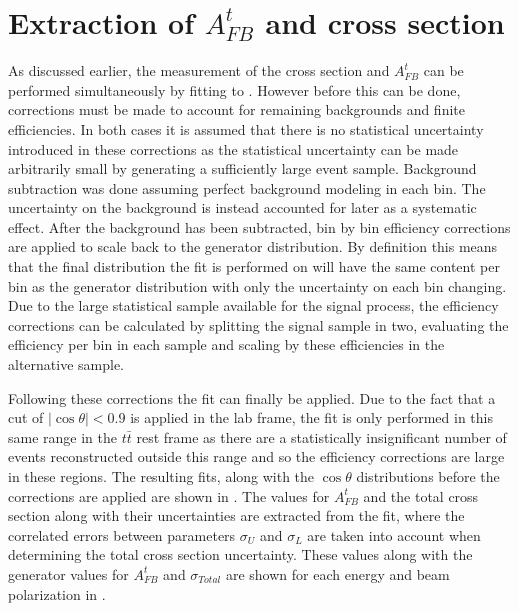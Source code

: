 \section{Extraction of $A_{FB}^t$ and cross section}
As discussed earlier, the measurement of the cross section and $A_{FB}^t$ can be performed simultaneously by fitting to . However before this can be done, corrections must be made to account for remaining backgrounds and finite efficiencies. In both cases it is assumed that there is no statistical uncertainty introduced in these corrections as the statistical uncertainty can be made arbitrarily small by generating a sufficiently large event sample. Background subtraction was done assuming perfect background modeling in each bin. The uncertainty on the background is instead accounted for later as a systematic effect. After the background has been subtracted, bin by bin efficiency corrections are applied to scale back to the generator distribution. By definition this means that the final distribution the fit is performed on will have the same content per bin as the generator distribution with only the uncertainty on each bin changing. Due to the large statistical sample available for the signal process, the efficiency corrections can be calculated by splitting the signal sample in two, evaluating the efficiency per bin in each sample and scaling by these efficiencies in the alternative sample.

Following these corrections the fit can finally be applied. Due to the fact that a cut of $\mid\cos\theta\mid < 0.9$ is applied in the lab frame, the fit is only performed in this same range in the $t\bar{t}$ rest frame as there are a statistically insignificant number of events reconstructed outside this range and so the efficiency corrections are large in these regions. The resulting fits, along with the $\cos\theta$ distributions before the corrections are applied are shown in . The values for $A_{FB}^t$ and the total cross section along with their uncertainties are extracted from the fit, where the correlated errors between parameters $\sigma_U$ and $\sigma_L$ are taken into account when determining the total cross section uncertainty. These values along with the generator values for $A_{FB}^t$ and $\sigma_{Total}$ are shown for each energy and beam polarization in .


